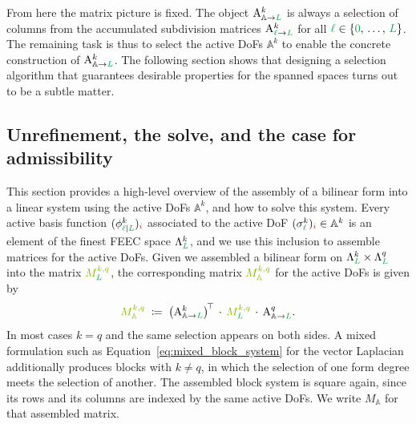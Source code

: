 \documentclass[a4paper, 12pt]{article}
\newcommand{\guidance}[1]{{\color{lime!70!black} #1}}
\newcommand{\green}{\color{ForestGreen}}
\newcommand{\brickred}{\color{BrickRed}}
\newcommand{\simplexname}{\sigma}
\newcommand{\simplex}[3]{\freeQ{\simplexname}{#1}{#2}{#3}}
\newcommand{\coarseIdxone}{{\brickred i}}
\renewcommand{\l}{{\green\ell}}
\renewcommand{\L}{{\green L}}
\newcommand{\lzero}{{\green 0}}
\newcommand{\constrQ}[5]{ ( {#1}^{#2}_{#3 \vert #4} )_{#5}} %
\newcommand{\freeQ}[4]{ ( {#1}^{#2}_{#3} )_{#4}}
\newcommand{\Amat}[3]{\mathbf{\mathrm{A}}^{#1}_{#2 \to #3}}
\newcommand{\FEECspace}[2]{\Lambda^{#1}_{#2}}
\newcommand{\SDFbasis}{\phi}
\newcommand{\activeDoFs}{\mathbb{A}}
\newcommand{\activeDoFSet}[2]{\activeDoFs^{#1}_{#2}}
\theoremstyle{definition}
\theoremstyle{plain}
\numberwithin{equation}{section}
\begin{document}
\smallskip

From here the matrix picture is fixed. The object $\Amat{k}{\activeDoFs}{\L}$ is always a selection of columns from the accumulated subdivision matrices $\Amat{k}{\l}{\L}$ for all $\l \in \{\lzero, \, \dots, \, \L\}$. The remaining task is thus to select the active DoFs $\activeDoFSet{k}{}$ to enable the concrete construction of $\Amat{k}{\activeDoFs}{\L}$. The following section shows that designing a selection algorithm that guarantees desirable properties for the spanned spaces turns out to be a subtle matter.

\subsection{Unrefinement, the solve, and the case for admissibility}
\label{subsec:unrefinement_and_solve}

This section provides a high-level overview of the assembly of a bilinear form into a linear system using the active DoFs $\activeDoFSet{k}{}$, and how to solve this system. Every active basis function $\constrQ{\SDFbasis}{k}{\l}{\L}{\coarseIdxone}$ associated to the active DoF $\simplex{k}{\l}{\coarseIdxone} \in \activeDoFSet{k}{}$ is an element of the finest FEEC space $\FEECspace{k}{\L}$, and we use this inclusion to assemble matrices for the active DoFs. Given we assembled a bilinear form on $\FEECspace{k}{\L} \times \FEECspace{q}{\L}$ into the matrix $\guidance{M^{k,q}_\L}$, the corresponding matrix $\guidance{M^{k,q}_{\activeDoFs}}$ for the active DoFs is given by
\begin{equation}
    \label{eq:unrefinement}
    \guidance{M^{k,q}_{\activeDoFs}} \; \coloneq \; \big( \Amat{k}{\activeDoFs}{\L} \big)^{\!\top}
    \, \cdot \, \guidance{M^{k,q}_\L} \, \cdot \, \Amat{q}{\activeDoFs}{\L}.
\end{equation}
In most cases $k = q$ and the same selection appears on both sides. A mixed formulation such as Equation~\eqref{eq:mixed_block_system} for the vector Laplacian additionally produces blocks with $k \neq q$, in which the selection of one form degree meets the selection of another. The assembled block system is square again, since its rows and its columns are indexed by the same active DoFs. \guidance{We write $M_{\activeDoFs}$ for that assembled matrix.}
\end{document}
